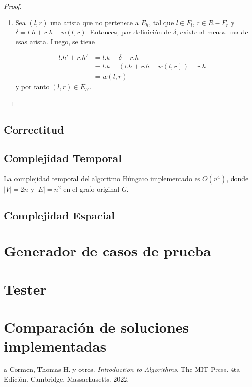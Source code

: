 \documentclass[10pt]{article} %
\begin{document}
\begin{proof}
\begin{enumerate}
			Se conoce que para $l \in F_l$ y $r \in F_r$ se cumple $l.h' + r.h' = l.h + r.h$. En caso contrario, cuando $l \in L-F_l$ y $r \in R-F_r$, se tiene que $l.h' = l.h$ y $r.h'=r.h$, entonces $l.h' + r.h' = l.h + r.h$. Por tanto, si la arista $(l,r)$ est\'a en el emparejamiento $M$ para el grafo $G_h$, entonces $(l,r) \in E_{h'}$.
			\item Sea $(l,r)$ una arista que no pertenece a $E_h$, tal que $l \in F_l$, $r \in R-F_r$ y $\delta = l.h + r.h - w(l,r)$. Entonces, por definici\'on de $\delta$, existe al menos una de esas arista. Luego, se tiene 
			
			\begin{align*}
				l.h' + r.h' &= l.h - \delta + r.h\\
				&= l.h - (l.h + r.h -w(l,r)) + r.h\\
				&= w(l,r)			
			\end{align*}
		y por tanto $(l,r) \in E_{h'}$. 
			
			
		\end{enumerate}
		
	\end{proof}

	
	\subsection{Correctitud}
	
	\subsection{Complejidad Temporal}
	
	La complejidad temporal del algoritmo H\'ungaro implementado es $O(n^4)$, donde $|V|=2n$ y $|E|=n^2$ en el grafo original $G$.
	
	
	
	
	
	
	\subsection{Complejidad Espacial}
	
	\section{Generador de casos de prueba}
	
	\section{Tester}
	
	
	\section{Comparaci\'on de soluciones implementadas}
	
	\begin{thebibliography}
		a
		 Cormen, Thomas H. y otros. \emph{Introduction to Algorithms}. 
		The MIT Press.
		4ta Edici\'on.		
		Cambridge, Massachusetts.
		2022.
	\end{thebibliography}
\end{document}
